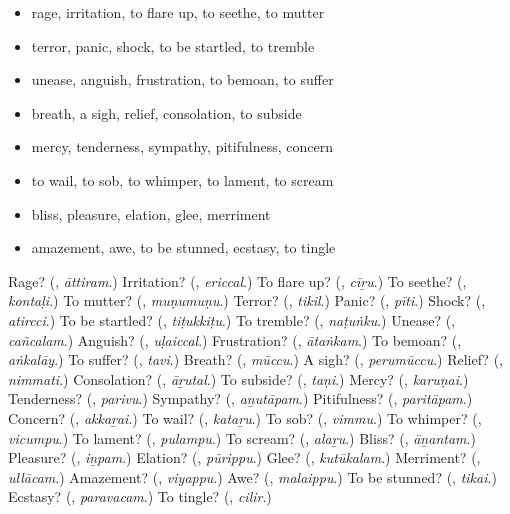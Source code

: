 \begin{itemize}
\raggedright
  \item rage, irritation, to flare up, to seethe, to mutter
  \item terror, panic, shock, to be startled, to tremble
  \item unease, anguish, frustration, to bemoan, to suffer
  \item breath, a sigh, relief, consolation, to subside
  \item mercy, tenderness, sympathy, pitifulness, concern
  \item to wail, to sob, to whimper, to lament, to scream
  \item bliss, pleasure, elation, glee, merriment
  \item amazement, awe, to be stunned, ecstasy, to tingle
\end{itemize}

\begin{tcolorbox}[breakable,colback=teal!4,colframe=teal!35!black,title={Before you move on}]
Rage? (\textbf{}, \emph{āttiram}.) Irritation? (\textbf{}, \emph{ericcal}.) To flare up? (\textbf{}, \emph{cīṟu}.) To seethe? (\textbf{}, \emph{kontaḷi}.) To mutter? (\textbf{}, \emph{muṇumuṇu}.) Terror? (\textbf{}, \emph{tikil}.) Panic? (\textbf{}, \emph{pīti}.) Shock? (\textbf{}, \emph{atircci}.) To be startled? (\textbf{}, \emph{tiṭukkiṭu}.) To tremble? (\textbf{}, \emph{naṭuṅku}.) Unease? (\textbf{}, \emph{cañcalam}.) Anguish? (\textbf{}, \emph{uḷaiccal}.) Frustration? (\textbf{}, \emph{ātaṅkam}.) To bemoan? (\textbf{}, \emph{aṅkalāy}.) To suffer? (\textbf{}, \emph{tavi}.) Breath? (\textbf{}, \emph{mūccu}.) A sigh? (\textbf{}, \emph{perumūccu}.) Relief? (\textbf{}, \emph{nimmati}.) Consolation? (\textbf{}, \emph{āṟutal}.) To subside? (\textbf{}, \emph{taṇi}.) Mercy? (\textbf{}, \emph{karuṇai}.) Tenderness? (\textbf{}, \emph{parivu}.) Sympathy? (\textbf{}, \emph{aṉutāpam}.) Pitifulness? (\textbf{}, \emph{paritāpam}.) Concern? (\textbf{}, \emph{akkaṟai}.) To wail? (\textbf{}, \emph{kataṟu}.) To sob? (\textbf{}, \emph{vimmu}.) To whimper? (\textbf{}, \emph{vicumpu}.) To lament? (\textbf{}, \emph{pulampu}.) To scream? (\textbf{}, \emph{alaṟu}.) Bliss? (\textbf{}, \emph{āṉantam}.) Pleasure? (\textbf{}, \emph{iṉpam}.) Elation? (\textbf{}, \emph{pūrippu}.) Glee? (\textbf{}, \emph{kutūkalam}.) Merriment? (\textbf{}, \emph{ullācam}.) Amazement? (\textbf{}, \emph{viyappu}.) Awe? (\textbf{}, \emph{malaippu}.) To be stunned? (\textbf{}, \emph{tikai}.) Ecstasy? (\textbf{}, \emph{paravacam}.) To tingle? (\textbf{}, \emph{cilir}.)
\end{tcolorbox}
